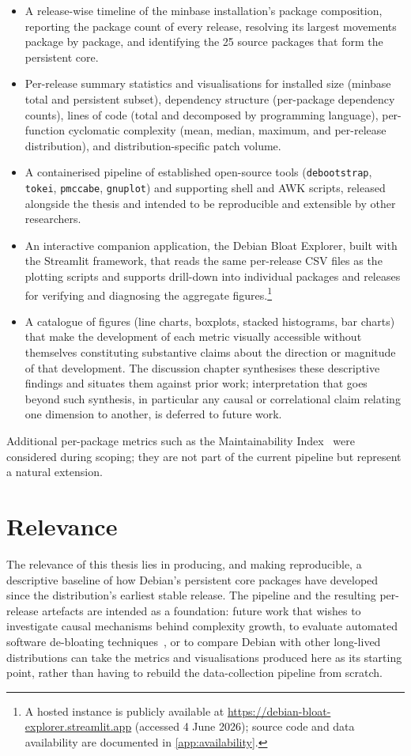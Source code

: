 \begin{itemize}
    \item A release-wise timeline of the minbase installation's package composition, reporting the package count of every release, resolving its largest movements package by package, and identifying the 25 source packages that form the persistent core.
    \item Per-release summary statistics and visualisations for installed size (minbase total and persistent subset), dependency structure (per-package dependency counts), lines of code (total and decomposed by programming language), per-function cyclomatic complexity (mean, median, maximum, and per-release distribution), and distribution-specific patch volume.
    \item A containerised pipeline of established open-source tools (\texttt{debootstrap}, \texttt{tokei}, \texttt{pmccabe}, \texttt{gnuplot}) and supporting shell and AWK scripts, released alongside the thesis and intended to be reproducible and extensible by other researchers.
    \item An interactive companion application, the Debian Bloat Explorer, built with the Streamlit framework, that reads the same per-release CSV files as the plotting scripts and supports drill-down into individual packages and releases for verifying and diagnosing the aggregate figures.\footnote{A hosted instance is publicly available at \url{https://debian-bloat-explorer.streamlit.app} (accessed 4 June 2026); source code and data availability are documented in \autoref{app:availability}.}
    \item A catalogue of figures (line charts, boxplots, stacked histograms, bar charts) that make the development of each metric visually accessible without themselves constituting substantive claims about the direction or magnitude of that development. The discussion chapter synthesises these descriptive findings and situates them against prior work; interpretation that goes beyond such synthesis, in particular any causal or correlational claim relating one dimension to another, is deferred to future work.
\end{itemize}

Additional per-package metrics such as the Maintainability Index~\cite{Coleman1994Using} were considered during scoping; they are not part of the current pipeline but represent a natural extension.

\section*{Relevance}
The relevance of this thesis lies in producing, and making reproducible, a descriptive baseline of how Debian's persistent core packages have developed since the distribution's earliest stable release. The pipeline and the resulting per-release artefacts are intended as a foundation: future work that wishes to investigate causal mechanisms behind complexity growth, to evaluate automated software de-bloating techniques~\cite{quach2018debloating}, or to compare Debian with other long-lived distributions can take the metrics and visualisations produced here as its starting point, rather than having to rebuild the data-collection pipeline from scratch.

